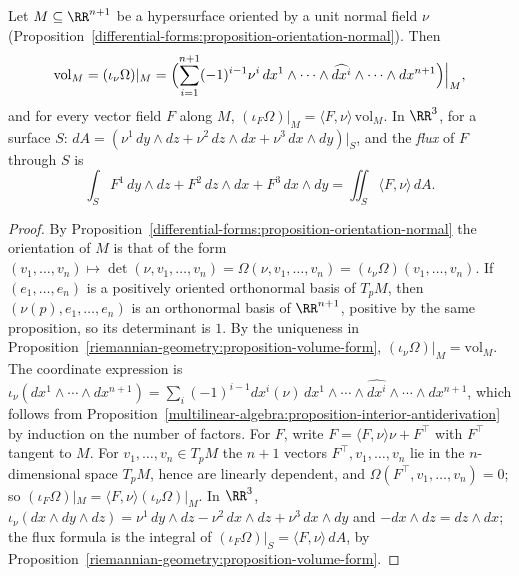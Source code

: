 \begin{proposition}\label{riemannian-geometry:proposition-flux}
Let $M \subseteq \RR^{n+1}$ be a hypersurface oriented by a unit normal field $\nu$ (Proposition~\ref{differential-forms:proposition-orientation-normal}). Then
\[
\mathrm{vol}_M = (\iota_\nu\Omega)|_M = \Bigl(\sum_{i=1}^{n+1}(-1)^{i-1}\nu^i\,dx^1 \wedge \cdots \wedge \widehat{dx^i} \wedge \cdots \wedge dx^{n+1}\Bigr)\Big|_M,
\]
and for every vector field $F$ along $M$, $(\iota_F\Omega)|_M = \langle F, \nu\rangle\,\mathrm{vol}_M$. In $\RR^3$, for a surface $S$:
$dA = (\nu^1\,dy \wedge dz + \nu^2\,dz \wedge dx + \nu^3\,dx \wedge dy)|_S$, and the \emph{flux} of $F$ through $S$ is
\[
\int_SF^1\,dy \wedge dz + F^2\,dz \wedge dx + F^3\,dx \wedge dy = \iint_S\langle F, \nu\rangle\,dA .
\]
\end{proposition}

\begin{proof}
By Proposition~\ref{differential-forms:proposition-orientation-normal} the orientation of $M$ is that of the form
$(v_1, \ldots, v_n) \mapsto \det(\nu, v_1, \ldots, v_n) = \Omega(\nu, v_1, \ldots, v_n) = (\iota_\nu\Omega)(v_1, \ldots, v_n)$. If $(e_1, \ldots, e_n)$ is a positively
oriented orthonormal basis of $T_pM$, then $(\nu(p), e_1, \ldots, e_n)$ is an orthonormal basis of $\RR^{n+1}$, positive by the same proposition, so its determinant is
$1$. By the uniqueness in Proposition~\ref{riemannian-geometry:proposition-volume-form}, $(\iota_\nu\Omega)|_M = \mathrm{vol}_M$. The coordinate expression is
$\iota_\nu(dx^1 \wedge \cdots \wedge dx^{n+1}) = \sum_i(-1)^{i-1}dx^i(\nu)\,dx^1 \wedge \cdots \wedge \widehat{dx^i} \wedge \cdots \wedge dx^{n+1}$, which follows from
Proposition~\ref{multilinear-algebra:proposition-interior-antiderivation} by induction on the number of factors. For $F$, write $F = \langle F, \nu\rangle\nu + F^\top$
with $F^\top$ tangent to $M$. For $v_1, \ldots, v_n \in T_pM$ the $n + 1$ vectors $F^\top, v_1, \ldots, v_n$ lie in the $n$-dimensional space $T_pM$, hence are
linearly dependent, and $\Omega(F^\top, v_1, \ldots, v_n) = 0$; so $(\iota_F\Omega)|_M = \langle F, \nu\rangle(\iota_\nu\Omega)|_M$. In $\RR^3$,
$\iota_\nu(dx \wedge dy \wedge dz) = \nu^1\,dy \wedge dz - \nu^2\,dx \wedge dz + \nu^3\,dx \wedge dy$ and $-dx \wedge dz = dz \wedge dx$; the flux formula is the integral
of $(\iota_F\Omega)|_S = \langle F, \nu\rangle\,dA$, by Proposition~\ref{riemannian-geometry:proposition-volume-form}.
\end{proof}

